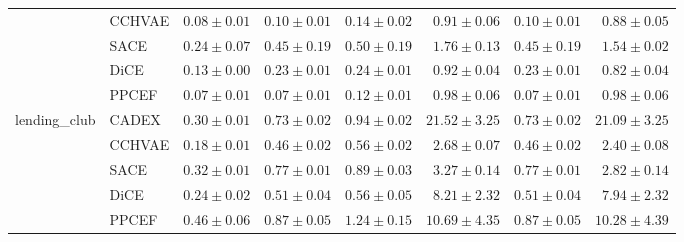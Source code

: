 \begin{table}[ht]
\begin{center}
\begin{sc}
\begin{scriptsize}
\begin{tabular}{l|l|rrrrrr}
 & CCHVAE & $0.08\pm{0.01}$ & $0.10\pm{0.01}$ & $0.14\pm{0.02}$ & $0.91\pm{0.06}$ & $0.10\pm{0.01}$ & $0.88\pm{0.05}$ \\
 & SACE & $0.24\pm{0.07}$ & $0.45\pm{0.19}$ & $0.50\pm{0.19}$ & $1.76\pm{0.13}$ & $0.45\pm{0.19}$ & $1.54\pm{0.02}$ \\
 & DiCE & $0.13\pm{0.00}$ & $0.23\pm{0.01}$ & $0.24\pm{0.01}$ & $0.92\pm{0.04}$ & $0.23\pm{0.01}$ & $0.82\pm{0.04}$ \\
 & PPCEF & $\boldsymbol{0.07\pm{0.01}}$ & $\boldsymbol{0.07\pm{0.01}}$ & $\boldsymbol{0.12\pm{0.01}}$ & $0.98\pm{0.06}$ & $\boldsymbol{0.07\pm{0.01}}$ & $0.98\pm{0.06}$ \\
\midrule
\multirow{5}{*}{lending\_club} & CADEX & $0.30\pm{0.01}$ & $0.73\pm{0.02}$ & $0.94\pm{0.02}$ & $21.52\pm{3.25}$ & $0.73\pm{0.02}$ & $21.09\pm{3.25}$ \\
 & CCHVAE & $\boldsymbol{0.18\pm{0.01}}$ & $\boldsymbol{0.46\pm{0.02}}$ & $\boldsymbol{0.56\pm{0.02}}$ & $\boldsymbol{2.68\pm{0.07}}$ & $\boldsymbol{0.46\pm{0.02}}$ & $\boldsymbol{2.40\pm{0.08}}$ \\
 & SACE & $0.32\pm{0.01}$ & $0.77\pm{0.01}$ & $0.89\pm{0.03}$ & $3.27\pm{0.14}$ & $0.77\pm{0.01}$ & $2.82\pm{0.14}$ \\
 & DiCE & $0.24\pm{0.02}$ & $0.51\pm{0.04}$ & $\boldsymbol{0.56\pm{0.05}}$ & $8.21\pm{2.32}$ & $0.51\pm{0.04}$ & $7.94\pm{2.32}$ \\
 & PPCEF & $0.46\pm{0.06}$ & $0.87\pm{0.05}$ & $1.24\pm{0.15}$ & $10.69\pm{4.35}$ & $0.87\pm{0.05}$ & $10.28\pm{4.39}$ \\
\bottomrule
\end{tabular}
\end{scriptsize}
\end{sc}
\end{center}
\end{table}

